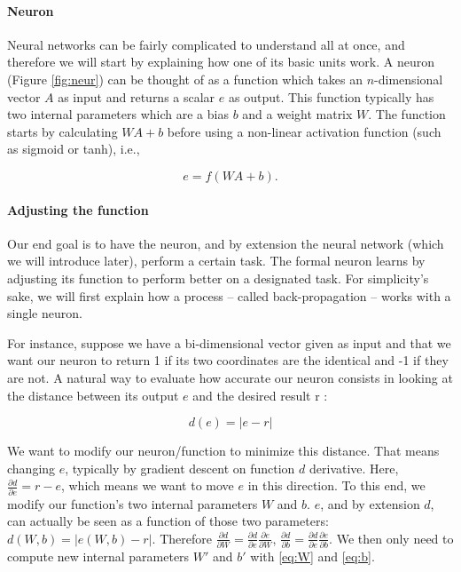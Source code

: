 \documentclass[conference]{IEEEtran}
\begin{document}
\paragraph{Neuron}

Neural networks can be fairly complicated to understand all at once, and
therefore we will start by explaining how one of its basic units work.
A neuron (Figure \ref{fig:neur}) can be thought of as a function which takes an $n$-dimensional vector
$A$ as input and returns a scalar $e$ as output. This function typically has two
internal parameters which are a bias $b$ and a weight matrix $W$. The function
starts by calculating $WA+b$ before using a non-linear activation function (such
as sigmoid or tanh), i.e.,

\begin{equation}
  e=f(WA+b).
\end{equation}

\paragraph{Adjusting the function}

Our end goal is to have the neuron, and by extension the neural network (which we
will introduce later), perform
a certain task. The formal neuron \og learns\fg{} by adjusting its function to perform better on
a designated task. For simplicity's sake, we will first explain how a
process -- called \og back-propagation\fg{} -- works with a single neuron.

For instance, suppose we have a bi-dimensional vector given as input and that we
want our neuron to return 1 if its two coordinates are the identical and -1 if
they are not. A natural way to evaluate how accurate our neuron consists in looking at the
distance between its output $e$ and the desired result r :

\begin{equation}
d(e)=|e-r|
\end{equation}

\noindent We want to modify our neuron/function to minimize this distance. That means
changing $e$, typically by gradient descent on function $d$ derivative. Here,
$\frac{\partial d}{\partial e} = r-e$, which means we want to \og move\fg{} $e$ in this
direction. To this end, we modify our function's two internal parameters $W$ and
$b$. $e$, and by extension $d$, can actually be seen as a function of those two
parameters: $d(W,b)=|e(W,b)-r|$. Therefore $\frac{\partial d}{\partial W}
   = \frac{\partial d}{\partial e}\frac{\partial e}{\partial W}$,
$\frac{\partial d}{\partial b}
   = \frac{\partial d}{\partial e}\frac{\partial e}{\partial b}$. We then only
   need to compute new internal parameters $W'$ and $b'$ with \ref{eq:W} and \ref{eq:b}.
\end{document}
